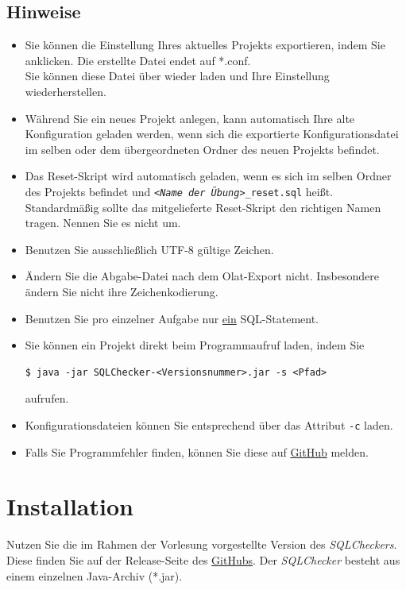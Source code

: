 \documentclass[11pt]{article}
\begin{document}
\subsection{Hinweise}
\begin{itemize}
\item Sie können die Einstellung Ihres aktuelles Projekts exportieren, indem Sie  anklicken. Die erstellte Datei endet auf *.conf. \\Sie können diese Datei über  wieder laden und Ihre Einstellung wiederherstellen.
\item Während Sie ein neues Projekt anlegen, kann automatisch Ihre alte Konfiguration geladen werden, wenn sich die exportierte Konfigurationsdatei im selben oder dem übergeordneten Ordner des neuen Projekts befindet.
\item Das Reset-Skript wird automatisch geladen, wenn es sich im selben Ordner des Projekts befindet und \texttt{\textit{<Name der Übung>}\_reset.sql} heißt. Standardmäßig sollte das mitgelieferte Reset-Skript den richtigen Namen tragen. Nennen Sie es nicht um.
\item Benutzen Sie ausschließlich UTF-8 gültige Zeichen.
\item Ändern Sie die Abgabe-Datei nach dem Olat-Export nicht. Insbesondere ändern Sie nicht ihre Zeichenkodierung.
\item Benutzen Sie pro einzelner Aufgabe nur \underline{ein} SQL-Statement.
\item Sie können ein Projekt direkt beim Programmaufruf laden, indem Sie
\begin{verbatim}
$ java -jar SQLChecker-<Versionsnummer>.jar -s <Pfad>
\end{verbatim}
aufrufen.
\item Konfigurationsdateien können Sie entsprechend über das Attribut \texttt{-c} laden. 
\item Falls Sie Programmfehler finden, können Sie diese auf  \href{https://github.com/ptrckbnck/SQLChecker/issues}{GitHub} melden.
\end{itemize}
\section{Installation}
Nutzen Sie die im Rahmen der Vorlesung vorgestellte Version des \textit{SQLCheckers}. Diese finden Sie auf der Release-Seite des \href{https://github.com/ptrckbnck/SQLChecker/releases}{GitHubs}.
Der \textit{SQLChecker} besteht aus einem einzelnen Java-Archiv (*.jar).
\end{document}
